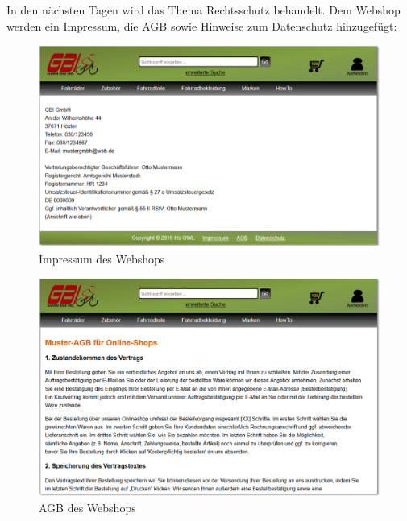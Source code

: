 In den nächsten Tagen wird das Thema Rechtsschutz behandelt. Dem Webshop werden ein Impressum, die AGB sowie Hinweise zum Datenschutz hinzugefügt:

\begin{figure}[H]
\begin{center}
\includegraphics[width=150mm]{Bilder/Abbildung6-ImpressumDesWebshops.png}
\end{center}
\caption{Impressum des Webshops}
\end{figure}

\begin{figure}[H]
\begin{center}
\includegraphics[width=150mm]{Bilder/Abbildung7-AGBDesWebshops.png}
\end{center}
\caption{AGB des Webshops}
\end{figure}

